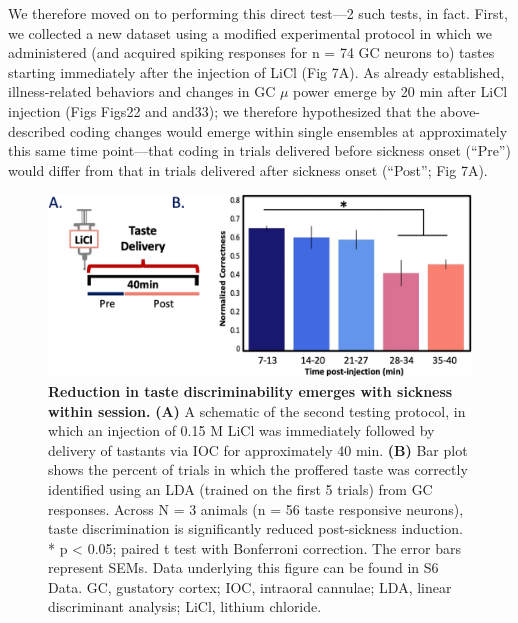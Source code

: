 \begin{refsection}
{We therefore moved on to performing this direct test—2 such tests, in fact. First, we collected a new dataset using a modified experimental protocol in which we administered (and acquired spiking responses for n = 74 GC neurons to) tastes starting immediately after the injection of LiCl (Fig 7A). As already established, illness-related behaviors and changes in GC \(\mu\) power emerge by 20 min after LiCl injection (Figs ​Figs22 and ​and33); we therefore hypothesized that the above-described coding changes would emerge within single ensembles at approximately this same time point—that coding in trials delivered before sickness onset (“Pre”) would differ from that in trials delivered after sickness onset (“Post”; Fig 7A).

\begin{figure}
\includegraphics[width=\linewidth]{stone_2022_figs/journal.pbio.3001537.g007.png} 
\caption{\textbf{Reduction in taste discriminability emerges with sickness within session.} \textbf{(A)} A schematic of the second testing protocol, in which an injection of 0.15 M LiCl was immediately followed by delivery of tastants via IOC for approximately 40 min. \textbf{(B)} Bar plot shows the percent of trials in which the proffered taste was correctly identified using an LDA (trained on the first 5 trials) from GC responses. Across N = 3 animals (n = 56 taste responsive neurons), taste discrimination is significantly reduced post-sickness induction. * p < 0.05; paired t test with Bonferroni correction. The error bars represent SEMs. Data underlying this figure can be found in S6 Data. GC, gustatory cortex; IOC, intraoral cannulae; LDA, linear discriminant analysis; LiCl, lithium chloride.
}
\label{fig:wrapfig}
\end{figure}


}
\end{refsection}
